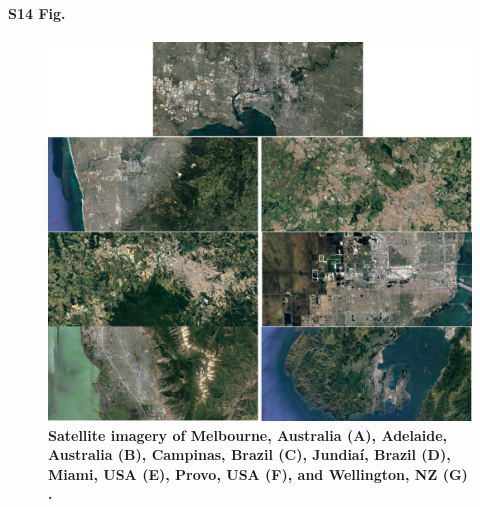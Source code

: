 \documentclass[10pt,letterpaper]{article}
\begin{document}
\paragraph*{S14 Fig.}
\begin{figure}[!htbp]
\centering    
\includegraphics[scale=0.35]{Images/PlosOne/Fig14.png} 
 \caption{\bf Satellite imagery of Melbourne, Australia (A), Adelaide, Australia (B), Campinas, Brazil (C), Jundia\'{i}, Brazil (D), Miami, USA (E), Provo, USA (F), and Wellington, NZ (G) \cite{GoogleStatic2017}.}    
 \label{fig:satimages}  
\end{figure} 
\end{document}
